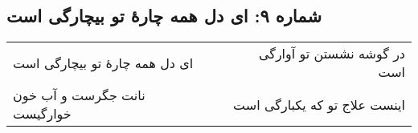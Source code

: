 \begin{center}
\section*{شماره ۹: ای دل همه چارۀ تو بیچارگی است}
\label{sec:009}
\begin{longtable}{l p{0.5cm} r}
ای دل همه چارهٔ تو بیچارگی است
&&
در گوشه نشستن تو آوارگی است
\\
نانت جگرست و آب خون خوارگیست
&&
اینست علاج تو که یکبارگی است
\\
\end{longtable}
\end{center}
